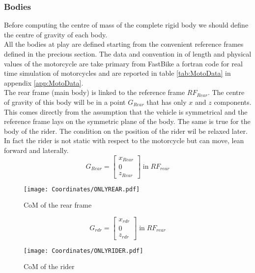 \subsubsection{Bodies}
%
Before computing the centre of mass of the complete rigid body we should define the centre of gravity of each body.\\
All the bodies at play are defined starting from the convenient reference frames defined in the precious section. The data  and convention in of length and physical values of the motorcycle are take primary from FastBike a fortran code for real time simulation of motorcycles and are reported in table \ref{tab:MotoData} in appendix \ref{app:MotoData}.\cite{cossalter2002motorcycle,cossalter2003multibody}\\
The rear frame (main body) is linked to the reference frame $RF_{Rear}$. The centre of gravity of this body will be in a point $G_{Rear}$ that has only $x$ and $z$ components. This comes directly from the assumption that the vehicle is symmetrical and the reference frame lays on the symmetric plane of the body. The same is true for the body of the rider. The condition on the position of the rider wil be relaxed later. In fact the rider is not static with respect to the motorcycle but can move, lean forward and laterally.
%
\begin{equation}
    G_{Rear} =
    \left[
    \begin{array}{c}
        x_{Rear}\\
        0\\
        z_{Rear}
    \end{array}
    \right]
    \; \text{in} \; RF_{rear}
\end{equation}
%
\begin{figure}[h!]
    \centering
    \texttt{[image: Coordinates/ONLYREAR.pdf]}
    \caption{CoM of the rear frame}
    \label{fig:CoMRear}
\end{figure}
%
\begin{equation}
    G_{rdr} =
    \left[
    \begin{array}{c}
        x_{rdr}\\
        0\\
        z_{rdr}
    \end{array}
    \right]
    \; \text{in} \; RF_{rear}
\end{equation}
%
\begin{figure}[h!]
    \centering
    \texttt{[image: Coordinates/ONLYRIDER.pdf]}
    \caption{CoM of the rider}
    \label{fig:CoMrdr}
\end{figure}
